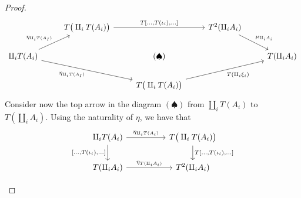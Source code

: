 \begin{subbox}{}
\begin{proof}
\[
\begin{tikzcd}
                                                                                   & T\big(\amalg_iT(A_i)\big) \arrow[rr, "{T[\ldots,T(\iota_i),\ldots]}"] &                                                        & T^2(\amalg_iA_i) \arrow[rd, "\mu_{\amalg_iA_i}"] &              \\
\amalg_iT(A_i) \arrow[ru, "\eta_{\amalg_iT(A_I)}"] \arrow[rrd, "\eta_{\amalg_iT(A_I)}"'] &                                                                     & (\spadesuit)                                           &                                              & T(\amalg_iA_i) \\
                                                                                   &                                                                     & T\big(\amalg_iT(A_i)\big) \arrow[rru, "T(\amalg_i\xi_i)"'] &                                              &             
\end{tikzcd}
\]
Consider now the top arrow in the diagram $(\spadesuit)$ from $\amalg_iT(A_i)$ to $T(\amalg_iA_i)$. Using the naturality of $\eta$, we have that
\[
\begin{tikzcd}
\amalg_iT(A_i) \arrow[d, "{[\ldots,T(\iota_i),\ldots]}"'] \arrow[rr, "\eta_{\amalg_iT(A_i)}"] &  & T\big(\amalg_iT(A_i)\big) \arrow[d, "{T[\ldots,T(\iota_i),\ldots]}"] \\
T(\amalg_iA_i) \arrow[rr, "\eta_{T(\amalg_iA_i)}"]                                            &  & T^2(\amalg_iA_i)                                                    
\end{tikzcd}
\]
\begin{align*}

\end{align*}
\end{proof}
\end{subbox}
